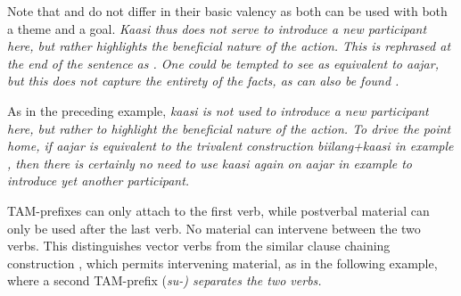 
Note that   and  do not differ in their basic valency as both can be used with both a theme and a goal. \em Kaasi \em thus does not serve to introduce a new participant here, but rather   highlights the beneficial nature of the action. This is rephrased at the end of the sentence as . One could be tempted to see  as equivalent to \em aajar\em, but this does not capture the entirety of the facts, as  can also be found .


As in the preceding example, \em kaasi \em is not used to introduce a new participant here, but rather to highlight the beneficial nature of the action. To drive the point home, if \em aajar \em is equivalent to the trivalent construction \em biilang+kaasi \em in example , then there is certainly no need to use \em kaasi \em again on \em aajar \em in example  to introduce yet another participant.

TAM-prefixes can only attach to the first verb, while postverbal material can only be used after the last verb. No material can intervene between the two verbs. This distinguishes vector verbs from  the similar clause chaining construction , which permits intervening material, as in the following example, where a second TAM-prefix (\em su-\em) separates the two verbs.
 



